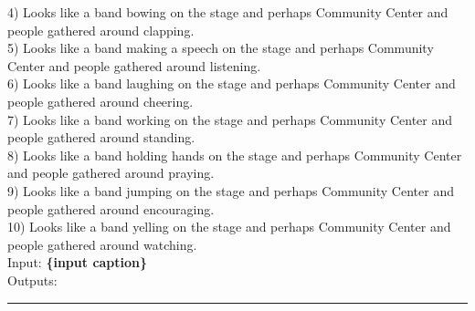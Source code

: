 {4) Looks like a band bowing on the stage and perhaps Community Center and people gathered around clapping.\\
5) Looks like a band making a speech on the stage and perhaps Community Center and people gathered around listening. \\
6) Looks like a band laughing on the stage and perhaps Community Center and people gathered around cheering.\\
7) Looks like a band working on the stage and perhaps Community Center and people gathered around standing.\\
8) Looks like a band holding hands on the stage and perhaps Community Center and people gathered around praying. \\
9) Looks like a band jumping on the stage and perhaps Community Center and people gathered around encouraging.\\
10) Looks like a band yelling on the stage and perhaps Community Center and people gathered around watching.\\
Input: \textbf{\{input caption\}}\\
Outputs: \\}
\noindent\rule{8.5cm}{0.4pt}

